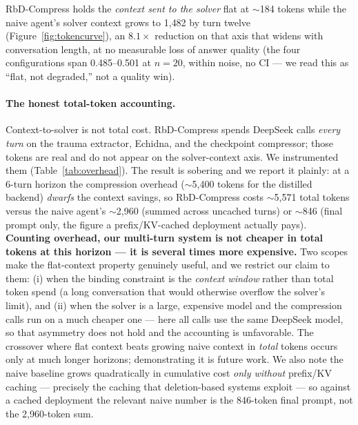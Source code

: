 \documentclass{article}
\begin{document}
RbD-Compress holds the \emph{context sent to the solver} flat at $\sim$184
tokens while the naive agent's solver context grows to 1{,}482 by turn twelve
(Figure~\ref{fig:tokencurve}), an $8.1\times$ reduction on that axis that
widens with conversation length, at no measurable loss of answer quality (the
four configurations span 0.485--0.501 at $n=20$, within noise, no CI --- we
read this as ``flat, not degraded,'' not a quality win).

\paragraph{The honest total-token accounting.}
\label{sec:audits-multiturn}
Context-to-solver is not total
cost. RbD-Compress spends DeepSeek calls \emph{every turn} on the trauma
extractor, Echidna, and the checkpoint compressor; those tokens are real and
do not appear on the solver-context axis. We instrumented them
(Table~\ref{tab:overhead}). The result is sobering and we report it plainly:
at a 6-turn horizon the compression overhead ($\sim$5{,}400 tokens for the
distilled backend) \emph{dwarfs} the context savings, so RbD-Compress costs
$\sim$5{,}571 total tokens versus the naive agent's $\sim$2{,}960 (summed
across uncached turns) or $\sim$846 (final prompt only, the figure a
prefix/KV-cached deployment actually pays). \textbf{Counting overhead, our
multi-turn system is not cheaper in total tokens at this horizon --- it is
several times more expensive.} Two scopes make the flat-context property
genuinely useful, and we restrict our claim to them: (i) when the binding
constraint is the \emph{context window} rather than total token spend (a long
conversation that would otherwise overflow the solver's limit), and (ii) when
the solver is a large, expensive model and the compression calls run on a much
cheaper one --- here all calls use the same DeepSeek model, so that asymmetry
does not hold and the accounting is unfavorable. The crossover where flat
context beats growing naive context in \emph{total} tokens occurs only at much
longer horizons; demonstrating it is future work. We also note the naive
baseline grows quadratically in cumulative cost \emph{only without} prefix/KV
caching --- precisely the caching that deletion-based systems exploit --- so
against a cached deployment the relevant naive number is the 846-token final
prompt, not the 2{,}960-token sum.
\end{document}
